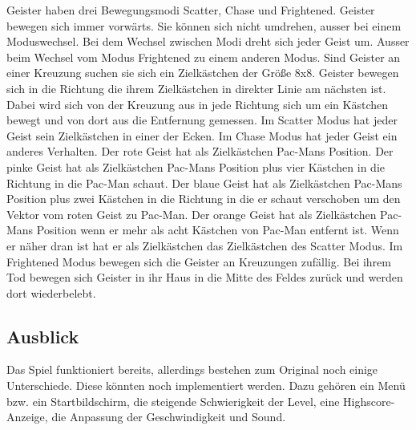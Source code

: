 \documentclass[a4paper, 11pt]{article}
\begin{document}
Geister haben drei Bewegungsmodi Scatter, Chase und Frightened. Geister bewegen sich immer vorwärts. Sie können sich nicht umdrehen, ausser bei einem Moduswechsel. Bei dem Wechsel zwischen Modi dreht sich jeder Geist um. Ausser beim Wechsel vom Modus Frightened zu einem anderen Modus. Sind Geister an einer Kreuzung suchen sie sich ein Zielkästchen der Größe 8x8. Geister bewegen sich in die Richtung die ihrem Zielkästchen in direkter Linie am nächsten ist. Dabei wird sich von der Kreuzung aus in jede Richtung sich um ein Kästchen bewegt und von dort aus die Entfernung gemessen. Im Scatter Modus hat jeder Geist sein Zielkästchen in einer der Ecken. Im Chase Modus hat jeder Geist ein anderes Verhalten. Der rote Geist hat als Zielkästchen Pac-Mans Position. Der pinke Geist hat als Zielkästchen Pac-Mans Position plus vier Kästchen in die Richtung in die Pac-Man schaut. Der blaue Geist hat als Zielkästchen Pac-Mans Position plus zwei Kästchen in die Richtung in die er schaut verschoben um den Vektor vom roten Geist zu Pac-Man. Der orange Geist hat als Zielkästchen Pac-Mans Position wenn er mehr als acht Kästchen von Pac-Man entfernt ist. Wenn er näher dran ist hat er als Zielkästchen das Zielkästchen des Scatter Modus. Im Frightened Modus bewegen sich die Geister an Kreuzungen zufällig. Bei ihrem Tod bewegen sich Geister in ihr Haus in die Mitte des Feldes zurück und werden dort wiederbelebt. \cite{PacManDossier}

\subsection{Ausblick}

Das Spiel funktioniert bereits, allerdings bestehen zum Original noch einige Unterschiede. Diese könnten noch implementiert werden. Dazu gehören ein Menü bzw. ein Startbildschirm, die steigende Schwierigkeit der Level, eine Highscore-Anzeige, die Anpassung der Geschwindigkeit und Sound. 

\pagebreak



\end{document}
